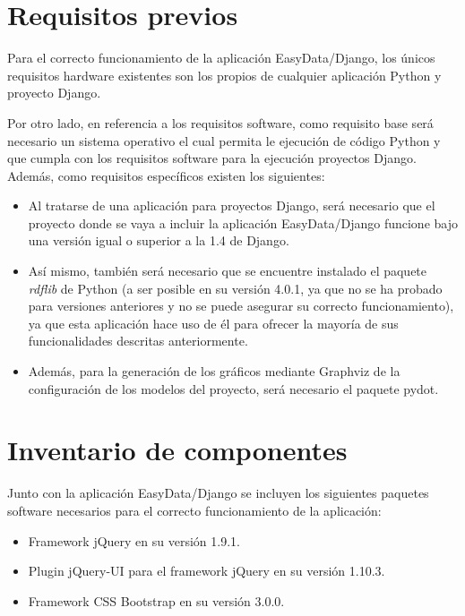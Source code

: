 \section{Requisitos previos}

Para el correcto funcionamiento de la aplicación EasyData/Django, los únicos
requisitos hardware existentes son los propios de cualquier aplicación Python y
proyecto Django.

Por otro lado, en referencia a los requisitos software, como requisito base será
necesario un sistema operativo el cual permita le ejecución de código Python y
que cumpla con los requisitos software para la ejecución proyectos Django.
Además, como requisitos específicos existen los siguientes:
\begin{itemize}
    \item Al tratarse de una aplicación para proyectos Django, será necesario
        que el proyecto donde se vaya a incluir la aplicación EasyData/Django
        funcione bajo una versión igual o superior a la 1.4 de Django.
    \item Así mismo, también será necesario que se encuentre instalado el
        paquete \textit{rdflib} de Python (a ser posible en su versión 4.0.1, ya
        que no se ha probado para versiones anteriores y no se puede asegurar su
        correcto funcionamiento), ya que esta aplicación hace uso de él para
        ofrecer la mayoría de sus funcionalidades descritas anteriormente.
    \item Además, para la generación de los gráficos mediante Graphviz de la
        configuración de los modelos del proyecto, será necesario el paquete
        pydot.
\end{itemize}

\section{Inventario de componentes}

Junto con la aplicación EasyData/Django se incluyen los siguientes paquetes
software necesarios para el correcto funcionamiento de la aplicación:
\begin{itemize}
    \item Framework jQuery en su versión 1.9.1.
    \item Plugin jQuery-UI para el framework jQuery en su versión 1.10.3.
    \item Framework CSS Bootstrap en su versión 3.0.0.
\end{itemize}


